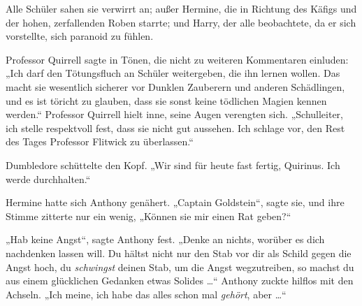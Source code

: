 Alle Schüler sahen sie verwirrt an; außer Hermine, die in Richtung des Käfigs und der hohen, zerfallenden Roben starrte; und Harry, der alle beobachtete, da er sich vorstellte, sich paranoid zu fühlen.

Professor Quirrell sagte in Tönen, die nicht zu weiteren Kommentaren einluden:
„Ich darf den Tötungsfluch an Schüler weitergeben, die ihn lernen wollen. Das macht sie wesentlich sicherer vor Dunklen Zauberern und anderen Schädlingen, und es ist töricht zu glauben, dass sie sonst keine tödlichen Magien kennen werden.“ Professor Quirrell hielt inne, seine Augen verengten sich.
„Schulleiter, ich stelle respektvoll fest, dass sie nicht gut aussehen. Ich schlage vor, den Rest des Tages Professor Flitwick zu überlassen.“

Dumbledore schüttelte den Kopf.
„Wir sind für heute fast fertig, Quirinus. Ich werde durchhalten.“

Hermine hatte sich Anthony genähert.
„Captain Goldstein“, sagte sie, und ihre Stimme zitterte nur ein wenig,
„Können sie mir einen Rat geben?“

„Hab keine Angst“, sagte Anthony fest.
„Denke an nichts, worüber es dich nachdenken lassen will. Du hältst nicht nur den Stab vor dir als Schild gegen die Angst hoch, du \emph{schwingst} deinen Stab, um die Angst wegzutreiben, so machst du aus einem glücklichen Gedanken etwas Solides …“ Anthony zuckte hilflos mit den Achseln.
„Ich meine, ich habe das alles schon mal \emph{gehört}, aber …“

